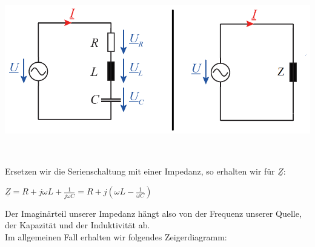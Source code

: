 \begin{center}
\includegraphics[scale=0.5]{img/schwingkreis_m_quelle.png}
\end{center}\

Ersetzen wir die Serienschaltung mit einer Impedanz, so erhalten wir für $\underline{Z}$: \\
\begin{center}

$\displaystyle \underline{Z} = R + j\omega L + \frac{1}{j \omega C} = R + j (\omega L - \frac{1}{\omega C})$ \\

\end{center}

Der Imaginärteil unserer Impedanz hängt also von der Frequenz unserer Quelle, der Kapazität und der Induktivität ab. \\
	Im allgemeinen Fall erhalten wir folgendes Zeigerdiagramm: \\
\begin{center}
\end{center}

